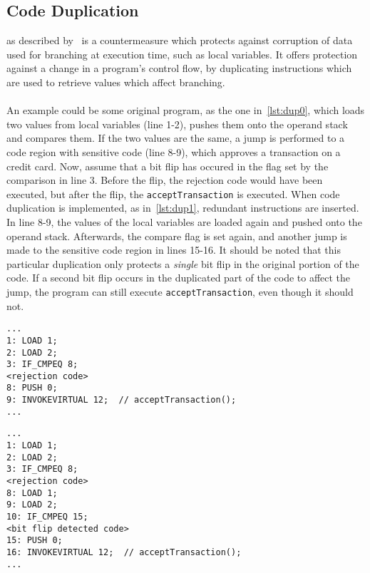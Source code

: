 \subsection{Code Duplication}as described by~\cite[p. 12]{javasec} is a countermeasure which protects against corruption of data used for branching at execution time, such as local variables. It offers protection against a change in a program's control flow, by duplicating instructions which are used to retrieve values which affect branching.\\\\
An example could be some original program, as the one in~\cref{lst:dup0}, which loads two values from local variables (line 1-2), pushes them onto the operand stack and compares them. If the two values are the same, a jump is performed to a code region with sensitive code (line 8-9), which approves a transaction on a credit card. Now, assume that a bit flip has occured in the flag set by the comparison in line 3. Before the flip, the rejection code would have been executed, but after the flip, the \texttt{acceptTransaction} is executed. When code duplication is implemented, as in~\cref{lst:dup1}, redundant instructions are inserted. In line 8-9, the values of the local variables are loaded again and pushed onto the operand stack. Afterwards, the compare flag is set again, and another jump is made to the sensitive code region in lines 15-16. It should be noted that this particular duplication only protects a \textit{single} bit flip in the original portion of the code. If a second bit flip occurs in the duplicated part of the code to affect the jump, the program can still execute \texttt{acceptTransaction}, even though it should not.

\begin{minipage}{\linewidth}
\begin{lstlisting}[caption={Original program without code duplication implemented. The code is written in \jcl. Note that for simplicity, the numbers in the left side are line numbers and do not denote the program counter values.}, label={lst:dup0}]
...
1: LOAD 1;
2: LOAD 2;
3: IF_CMPEQ 8;
<rejection code>
8: PUSH 0;
9: INVOKEVIRTUAL 12;  // acceptTransaction();
...
\end{lstlisting}
\end{minipage}

\begin{minipage}{\linewidth}
\begin{lstlisting}[caption={Modified program with code duplication implemented. The code is written in \jcl. Note that for simplicity, the numbers in the left side are line numbers and do not denote the program counter values.}, label={lst:dup1}]
...
1: LOAD 1;
2: LOAD 2;
3: IF_CMPEQ 8;
<rejection code>
8: LOAD 1;
9: LOAD 2;
10: IF_CMPEQ 15;
<bit flip detected code>
15: PUSH 0;
16: INVOKEVIRTUAL 12;  // acceptTransaction();
...
\end{lstlisting}
\end{minipage}
